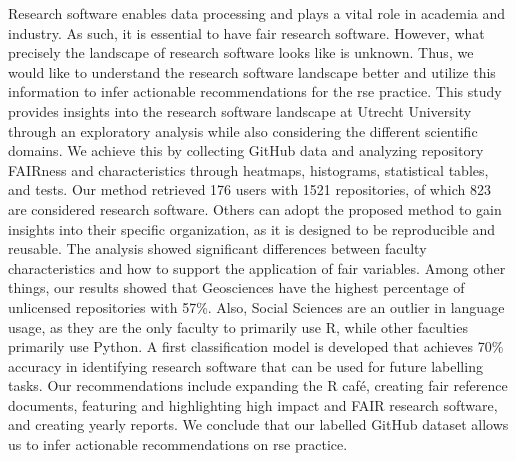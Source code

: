 

Research software enables data processing and plays a vital role in academia and industry. As such, it is essential to have \acrfull{fair} research software. However, what precisely the landscape of research software looks like is unknown. Thus, we would like to understand the research software landscape better and utilize this information to infer actionable recommendations for the \acrfull{rse} practice.
This study provides insights into the research software landscape at Utrecht University through an exploratory analysis while also considering the different scientific domains. We achieve this by collecting GitHub data and analyzing repository FAIRness and characteristics through heatmaps, histograms, statistical tables, and tests. 
Our method retrieved 176 users with 1521 repositories, of which 823 are considered research software. Others can adopt the proposed method to gain insights into their specific organization, as it is designed to be reproducible and reusable.
The analysis showed significant differences between faculty characteristics and how to support the application of \acrshort{fair} variables. Among other things, our results showed that Geosciences have the highest percentage of unlicensed repositories with 57\%. Also, Social Sciences are an outlier in language usage, as they are the only faculty to primarily use R, while other faculties primarily use Python.
A first classification model is developed that achieves 70\% accuracy in identifying research software that can be used for future labelling tasks. 
Our recommendations include expanding the R café, creating \acrshort{fair} reference documents, featuring and highlighting high impact and FAIR research software, and creating yearly reports.
We conclude that our labelled GitHub dataset allows us to infer actionable recommendations on \acrshort{rse} practice. 


